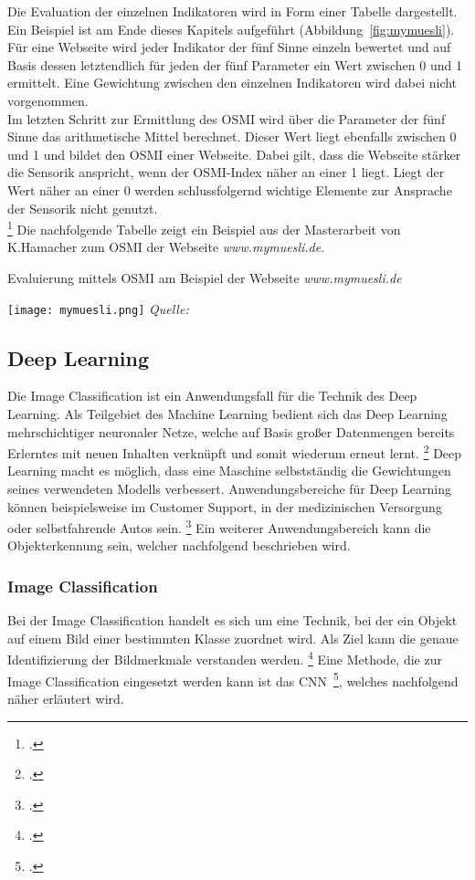 Die Evaluation der einzelnen Indikatoren wird in Form einer Tabelle dargestellt. Ein Beispiel ist am Ende dieses Kapitels aufgeführt (Abbildung~\ref{fig:mymuesli}).
Für eine Webseite wird jeder Indikator der fünf Sinne einzeln bewertet und auf Basis dessen letztendlich für jeden der fünf Parameter ein Wert zwischen 0 und 1 ermittelt.
Eine Gewichtung zwischen den einzelnen Indikatoren wird dabei nicht vorgenommen. \\
Im letzten Schritt zur Ermittlung des \ac{OSMI} wird über die Parameter der fünf Sinne das arithmetische Mittel berechnet.
Dieser Wert liegt ebenfalls zwischen 0 und 1 und bildet den \ac{OSMI} einer Webseite. Dabei gilt, dass die Webseite stärker die Sensorik anspricht, wenn der OSMI-Index näher an einer 1 liegt.
Liegt der Wert näher an einer 0 werden schlussfolgernd wichtige Elemente zur Ansprache der Sensorik nicht genutzt. \\ \footcite[\vglf][ \& 58]{hamacher2018}
Die nachfolgende Tabelle zeigt ein Beispiel aus der Masterarbeit von K.Hamacher zum \ac{OSMI} der Webseite \textit{www.mymuesli.de}.

\begin{table}[H]
    \caption{Evaluierung mittels \ac{OSMI} am Beispiel der Webseite \textit{www.mymuesli.de}}\label{fig:mymuesli}
    \texttt{[image: mymuesli.png]}
    \textit{Quelle:~\cite[][]{hamacher2018}}
\end{table}

\subsection{Deep Learning}

Die Image Classification ist ein Anwendungsfall für die Technik des Deep Learning.
Als Teilgebiet des Machine Learning bedient sich das Deep Learning mehrschichtiger neuronaler Netze, welche auf Basis großer Datenmengen bereits Erlerntes mit neuen Inhalten verknüpft und somit wiederum erneut lernt. \footcite[\vglf][ \& 3]{plaat2022}
Deep Learning macht es möglich, dass eine Maschine selbstständig die Gewichtungen seines verwendeten Modells verbessert.
Anwendungsbereiche für Deep Learning können beispielsweise im Customer Support, in der medizinischen Versorgung oder selbstfahrende Autos sein. \footcite[\vglf][ \& 511]{handa2021}
Ein weiterer Anwendungsbereich kann die Objekterkennung sein, welcher nachfolgend beschrieben wird.

\subsubsection{Image Classification}\label{sec_grundlagen_image_classification}
Bei der Image Classification handelt es sich um eine Technik, bei der ein Objekt auf einem Bild einer bestimmten Klasse zuordnet wird. Als Ziel kann die genaue Identifizierung der Bildmerkmale verstanden werden. \footcite[\vglf][]{internationalconferenceoncomputercommunicationandinformatics2021}
Eine Methode, die zur Image Classification eingesetzt werden kann ist das \ac{CNN}~\footcite[\vglf][]{internationalconferenceonadvancesinelectronics2018}, welches nachfolgend näher erläutert wird.

